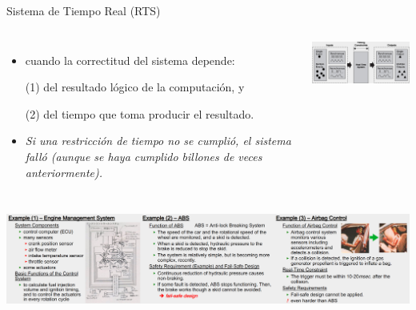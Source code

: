 \documentclass[8pt,aspectratio=169,compress]{beamer}
\begin{document}
\begin{frame}{Sistema de Tiempo Real (RTS)}

   \begin{columns}[onlytextwidth,T]
     \column{\dimexpr\linewidth-70mm-5mm}

\begin{itemize}
  \item[RTS] cuando la correctitud del sistema depende:

\bigskip
(1) del resultado lógico de la computación, y

\bigskip
(2) del tiempo que toma producir el resultado.

\bigskip
  \item[FALLO] \textit{Si una restricción de tiempo no se cumplió, el sistema falló (aunque se haya cumplido billones de veces anteriormente).}

\end{itemize}

      \column{70mm}
    \includegraphics[width=70mm]{images/rts.jpg}

    \end{columns}
\bigskip
    \includegraphics[width=140mm]{images/ejemplos.jpg}

\end{frame}
\end{document}
